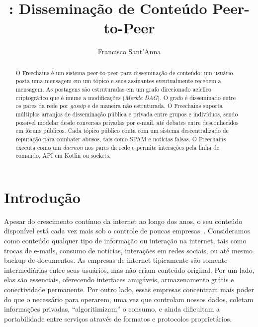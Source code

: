 \documentclass[12pt]{article}
\title{\FC: Disseminação de Conteúdo Peer-to-Peer}
\author{Francisco Sant'Anna\inst{1}}
\newcommand{\FC} {Freechains\xspace}
\begin{document}
 

\maketitle

\begin{abstract}
O \FC é um sistema peer-to-peer para disseminação de conteúdo: um
usuário posta uma mensagem em um tópico e seus assinantes eventualmente recebem
a mensagem.
As postagens são estruturadas em um grafo direcionado acíclico criptográfico
que é imune a modificações (\emph{Merkle DAG}).
O grafo é disseminado entre os pares da rede por \emph{gossip} e de maneira não
estruturada.
O \FC suporta múltiplos arranjos de disseminação pública e privada entre grupos
e indivíduos, sendo possível modelar desde conversas privadas por e-mail, até
debates entre desconhecidos em fóruns públicos.
Cada tópico público conta com um sistema descentralizado de reputação para
combater abusos, tais como SPAM e notícias falsas.
O \FC executa como um \emph{daemon} nos pares da rede e permite
interações pela linha de comando, API em Kotlin ou sockets.
\end{abstract}
     

\section{Introdução}

Apesar do crescimento contínuo da internet ao longo dos anos, o seu conteúdo
disponível está cada vez mais sob o controle de poucas
empresas~\cite{internet.fixing}.
Consideramos como conteúdo qualquer tipo de informação ou interação na
internet, tais como trocas de e-mails, consumo de notícias, interações em redes
sociais, ou até mesmo backup de documentos.
%
As empresas de internet tipicamente são somente intermediárias entre seus
usuários, mas não criam conteúdo original.
Por um lado, elas são essenciais, oferecendo interfaces amigáveis,
armazenamento grátis e conectividade permanente.
Por outro lado, essas empresas concentram mais poder do que o necessário para
operarem, uma vez que controlam nossos dados, coletam informações privadas,
``algoritimizam'' o consumo, e ainda dificultam a portabilidade entre serviços
através de formatos e protocolos proprietários.
\end{document}
